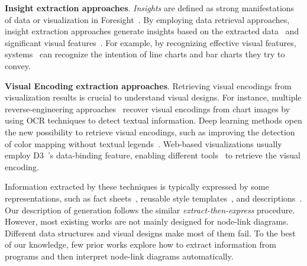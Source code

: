 \noindent \textbf{Insight extraction approaches}. 
\textit{Insights} are defined as strong manifestations of data or visualization in Foresight~\cite{DBLP:journals/pvldb/DemiralpHPP17}. 
By employing data retrieval approaches, insight extraction approaches generate insights based on the extracted data~\cite{DBLP:conf/inlg/ObeidH20, DBLP:conf/apvis/LiuXHWY20, DBLP:journals/tvcg/WangSZCXMZ20, DBLP:journals/ivs/CuiBYE19} and significant visual features~\cite{DBLP:conf/diagrams/WuCEC10, DBLP:journals/nrhm/DemirOSECMC10}. 
For example, by recognizing effective visual features, systems~\cite{DBLP:conf/diagrams/WuCEC10, DBLP:journals/nrhm/DemirOSECMC10} can recognize the intention of line charts and bar charts they try to convey.

\noindent \textbf{Visual Encoding extraction approaches}. Retrieving visual encodings from visualization results is crucial to understand visual designs. 
For instance, multiple reverse-engineering approaches~\cite{DBLP:journals/cgf/PocoH17, DBLP:journals/tvcg/PocoMH18, DBLP:conf/sibgrapi/MayhuaNHP18} recover visual encodings from chart images by using OCR techniques to detect textual information.
Deep learning methods open the new possibility to retrieve visual encodings, such as improving the detection of color mapping without textual legends~\cite{DBLP:journals/corr/abs-2103-00741}. 
Web-based visualizations usually employ D3~\cite{DBLP:journals/tvcg/BostockOH11}'s data-binding feature, enabling different tools~\cite{DBLP:conf/uist/HarperA14, DBLP:journals/tvcg/HarperA18, DBLP:journals/tvcg/HoqueA20} to retrieve the visual encoding.


Information extracted by these techniques is typically expressed by some representations, such as fact sheets~\cite{DBLP:journals/tvcg/WangSZCXMZ20}, reusable style templates~\cite{DBLP:journals/tvcg/HarperA18}, and descriptions~\cite{DBLP:conf/apvis/LiuXHWY20, DBLP:conf/inlg/ObeidH20}.
Our description of generation follows the similar \textit{extract-then-express} procedure.
However, most existing works are not mainly designed for node-link diagrams. Different data structures and visual designs make most of them fail. To the best of our knowledge, few prior works explore how to extract information from programs and then interpret node-link diagrams automatically.

